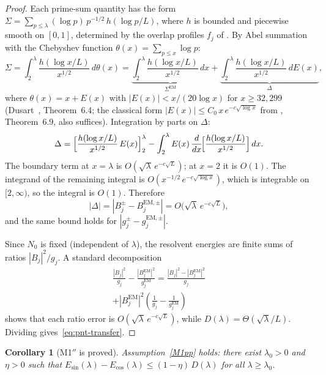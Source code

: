 \documentclass[12pt,a4paper]{article}
\newtheorem{corollary}[theorem]{Corollary}
\theoremstyle{definition}
\theoremstyle{remark}
\begin{document}
\begin{proof}
Each prime-sum quantity has the form $\Sigma = \sum_{p \leq \lambda} (\log p)\,p^{-1/2}\,h(\log p/L)$, where $h$ is bounded and piecewise smooth on $[0,1]$, determined by the overlap profiles $f_j$ of . By Abel summation with the Chebyshev function $\theta(x) = \sum_{p \leq x} \log p$:
\[
  \Sigma = \int_2^{\lambda} \frac{h(\log x/L)}{x^{1/2}}\,d\theta(x)
  = \underbrace{\int_2^{\lambda} \frac{h(\log x/L)}{x^{1/2}}\,dx}_{\Sigma^{\mathrm{EM}}}
  + \underbrace{\int_2^{\lambda} \frac{h(\log x/L)}{x^{1/2}}\,dE(x)}_{\Delta},
\]
where $\theta(x) = x + E(x)$ with $|E(x)| < x/(20\log x)$ for $x \geq 32{,}299$ (Dusart~\cite{Dusart2010}, Theorem~6.4; the classical form $|E(x)| \leq C_0\,x\,e^{-c\sqrt{\log x}}$ from \cite{IwaniecKowalski2004}, Theorem~6.9, also suffices). Integration by parts on $\Delta$:
\[
  \Delta = \Bigl[\frac{h(\log x/L)}{x^{1/2}}\,E(x)\Bigr]_2^{\lambda}
  - \int_2^{\lambda} E(x)\,\frac{d}{dx}\!\Bigl[\frac{h(\log x/L)}{x^{1/2}}\Bigr]\,dx.
\]
The boundary term at $x = \lambda$ is $O(\sqrt{\lambda}\,e^{-c\sqrt{L}})$; at $x = 2$ it is $O(1)$. The integrand of the remaining integral is $O(x^{-1/2}\,e^{-c\sqrt{\log x}})$, which is integrable on $[2,\infty)$, so the integral is $O(1)$. Therefore
\begin{equation}
\label{eq:pnt-error}
  |\Delta| = |B_j^{\pm} - B_j^{\mathrm{EM},\pm}| = O\!\bigl(\sqrt{\lambda}\,e^{-c\sqrt{L}}\bigr),
\end{equation}
and the same bound holds for $|g_j^{\pm} - g_j^{\mathrm{EM},\pm}|$.

Since $N_0$ is fixed (independent of $\lambda$), the resolvent energies are finite sums of ratios $|B_j|^2/g_j$. A standard decomposition
\begin{multline*}
  \frac{|B_j|^2}{g_j} - \frac{|B_j^{\mathrm{EM}}|^2}{g_j^{\mathrm{EM}}}
  = \frac{|B_j|^2 - |B_j^{\mathrm{EM}}|^2}{g_j} \\
  + |B_j^{\mathrm{EM}}|^2\!\left(\frac{1}{g_j} - \frac{1}{g_j^{\mathrm{EM}}}\right)
\end{multline*}
shows that each ratio error is $O(\sqrt{\lambda}\,e^{-c\sqrt{L}})$, while $D(\lambda) = \Theta(\sqrt{\lambda}/L)$. Dividing gives~\eqref{eq:pnt-transfer}.
\end{proof}

\begin{corollary}[M1$''$ is proved]
\label{cor:M1-proved}
Assumption~\ref{M1pp} holds: there exist $\lambda_0 > 0$ and $\eta > 0$ such that $E_{\sin}(\lambda) - E_{\cos}(\lambda) \leq (1-\eta)\,D(\lambda)$ for all $\lambda \geq \lambda_0$.
\end{corollary}
\end{document}
